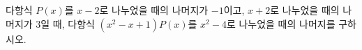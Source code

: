 다항식 $P(x)$를 $x-2$로 나누었을 때의 나머지가 $-1$이고, $x+2$로 나누었을 때의 나머지가 $3$일 때, 다항식 $(x^2-x+1)P(x)$를 $x^2-4$로 나누었을 때의 나머지를 구하시오.

